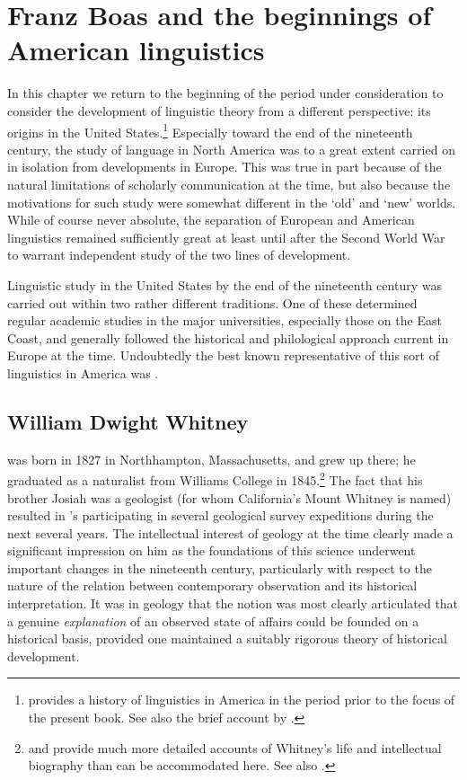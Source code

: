 \chapter{Franz Boas and the beginnings of American linguistics}
\label{ch.boas}

In this chapter we return to the beginning of the period under
consideration to consider the development of linguistic theory from a
different perspective: its origins in the United
States.\footnote{\citet{andresen90:lx.in.america} provides a history
  of linguistics in America in the period prior to the focus of the
  present book. See also the brief account by
  \citet{edgerton43:early.american}.} Especially toward the end of the
nineteenth century, the study of language in North America was to a
great extent carried on in isolation from developments in Europe. This
was true in part because of the natural limitations of scholarly
communication at the time, but also because the motivations for such
study were somewhat different in the `old' and `new' worlds. While of
course never absolute, the separation of European and American
linguistics remained sufficiently great at least until after the
Second World War to warrant independent study of the two lines of
development.

Linguistic study in the United States by the end of the nineteenth
century was carried out within two rather different traditions. One of
these determined {regular} academic studies in the major universities,
especially those on the East Coast, and generally followed the
historical and philological approach current in Europe at the
time. Undoubtedly the best known representative of this sort of
linguistics in America was {\Whitney}.

\section{William Dwight Whitney}

{\Whitney} was born in 1827 in Northhampton, Massachusetts, and grew up
there; he graduated as a naturalist from Williams College in
1845.\footnote{\citet{silverstein71:whitney} and
  \citet{alter05:whitney} provide much more detailed accounts of
  Whitney's life and intellectual biography than can be accommodated
  here. See also \citet[19--46]{joseph02:whitney.to-chomsky}.} The
fact that his brother Josiah was a geologist (for whom California's Mount Whitney is named) resulted in {\Whitney}'s participating in several
geological survey expeditions during the next several years. The
intellectual interest of geology at the time clearly made a
significant impression on him as the foundations of this science
underwent important changes in the nineteenth century, particularly
with respect to the nature of the relation between contemporary
observation and its historical interpretation. It was in geology that
the notion was most clearly articulated that a genuine
\emph{explanation} of an observed state of affairs could be founded on
a historical basis, provided one maintained a suitably rigorous theory
of historical development.

